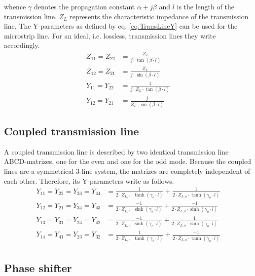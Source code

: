 whence $\gamma$ denotes the propagation constant $\alpha + j\beta$ and
$l$ is the length of the transmission line.  $Z_L$ represents the
characteristic impedance of the transmission line.  The Y-parameters
as defined by eq. \eqref{eq:TransLineY} can be used for the microstrip
line.  For an ideal, i.e. lossless, transmission lines they write
accordingly.
\begin{align}
Z_{11} = Z_{22} &= \frac{Z_L}{j\cdot\tan{\left(\beta\cdot l\right)}}\\
Z_{12} = Z_{21} &= \frac{Z_L}{j\cdot\sin{\left(\beta\cdot l\right)}}\\
Y_{11} = Y_{22} &= \frac{1}{j\cdot Z_L \cdot \tan{\left(\beta\cdot l\right)}}\\
Y_{12} = Y_{21} &= \frac{j}{Z_L\cdot \sin{\left(\beta\cdot l\right)}}
\end{align}

\subsection{Coupled transmission line}

A coupled transmission line is described by two identical
transmission line ABCD-matrizes, one for the even and one for
the odd mode. Because the coupled lines are a symmetrical 3-line
system, the matrizes are completely independent of each other.
Therefore, its Y-parameters write as follows.
\begin{align}
Y_{11} = Y_{22} = Y_{33} = Y_{44} &= \frac{1}{2\cdot Z_{L,e} \cdot \tanh\left(\gamma_e\cdot l\right)}
              + \frac{1}{2\cdot Z_{L,o} \cdot \tanh\left(\gamma_o\cdot l\right)}\\
Y_{12} = Y_{21} = Y_{34} = Y_{43} &= \frac{-1}{2\cdot Z_{L,e} \cdot \sinh\left(\gamma_e\cdot l\right)}
              + \frac{-1}{2\cdot Z_{L,o} \cdot \sinh\left(\gamma_o\cdot l\right)}\\
Y_{13} = Y_{31} = Y_{24} = Y_{42} &= \frac{-1}{2\cdot Z_{L,e} \cdot \sinh\left(\gamma_e\cdot l\right)}
              + \frac{1}{2\cdot Z_{L,o} \cdot \sinh\left(\gamma_o\cdot l\right)}\\
Y_{14} = Y_{41} = Y_{23} = Y_{32} &= \frac{1}{2\cdot Z_{L,e} \cdot \tanh\left(\gamma_e\cdot l\right)}
              + \frac{-1}{2\cdot Z_{L,o} \cdot \tanh\left(\gamma_o\cdot l\right)}\\
\end{align}



\subsection{Phase shifter}

